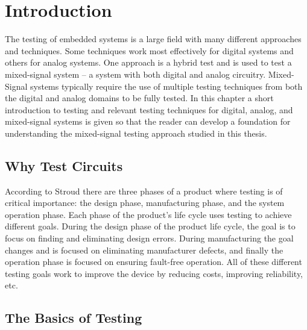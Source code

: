 \documentclass[12pt]{report}
\begin{document}
\normalem       %


\chapter{Introduction}  %

The testing of embedded systems is a large field with many different approaches and techniques.  Some techniques work most effectively for digital systems and others for analog systems.  One approach is a hybrid test and is used to test a mixed-signal system -- a system with both digital and analog circuitry.  Mixed-Signal systems typically require the use of multiple testing techniques from both the digital and analog domains to be fully tested.  In this chapter a short introduction to testing and relevant testing techniques for digital, analog, and mixed-signal systems is given so that the reader can develop a foundation for understanding the mixed-signal testing approach studied in this thesis. 

\section{Why Test Circuits}
\label{sct:whytest}
According to Stroud\cite{stroud} there are three phases of a product where testing is of critical importance: the design phase, manufacturing phase, and the system operation phase.  Each phase of the product's life cycle uses testing to achieve different goals.  During the design phase of the product life cycle, the goal is to focus on finding and eliminating design errors.  During manufacturing the goal changes and is focused on eliminating manufacturer defects, and finally the operation phase is focused on ensuring fault-free operation.  All of these different testing goals work to improve the device by reducing costs, improving reliability, etc.  

\section{The Basics of Testing}
\label{sct:basictesting}
\end{document}
